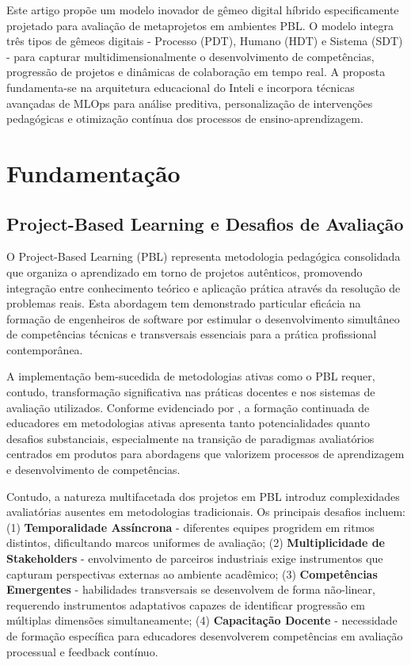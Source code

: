\documentclass[english, spanish, brazilian]{RBIEarticle} %
\begin{document}
Este artigo propõe um modelo inovador de gêmeo digital híbrido especificamente
projetado para avaliação de metaprojetos em ambientes PBL. O modelo integra
três tipos de gêmeos digitais - Processo (PDT), Humano (HDT) e Sistema (SDT) -
para capturar multidimensionalmente o desenvolvimento de competências,
progressão de projetos e dinâmicas de colaboração em tempo real. A proposta
fundamenta-se na arquitetura educacional do Inteli e incorpora técnicas
avançadas de MLOps para análise preditiva, personalização de intervenções
pedagógicas e otimização contínua dos processos de ensino-aprendizagem.

\section{Fundamentação}

\subsection{Project-Based Learning e Desafios de Avaliação}

O Project-Based Learning (PBL) representa metodologia pedagógica consolidada
que organiza o aprendizado em torno de projetos autênticos, promovendo
integração entre conhecimento teórico e aplicação prática através da resolução
de problemas reais. Esta abordagem tem demonstrado particular eficácia na
formação de engenheiros de software por estimular o desenvolvimento simultâneo
de competências técnicas e transversais essenciais para a prática profissional
contemporânea.

A implementação bem-sucedida de metodologias ativas como o PBL requer, contudo,
transformação significativa nas práticas docentes e nos sistemas de avaliação
utilizados. Conforme evidenciado por \cite{FormacaoEducadores2024}, a formação
continuada de educadores em metodologias ativas apresenta tanto potencialidades
quanto desafios substanciais, especialmente na transição de paradigmas
avaliatórios centrados em produtos para abordagens que valorizem processos de
aprendizagem e desenvolvimento de competências.

Contudo, a natureza multifacetada dos projetos em PBL introduz complexidades
avaliatórias ausentes em metodologias tradicionais. Os principais desafios
incluem: (1) \textbf{Temporalidade Assíncrona} - diferentes equipes progridem
em ritmos distintos, dificultando marcos uniformes de avaliação; (2)
\textbf{Multiplicidade de Stakeholders} - envolvimento de parceiros industriais
exige instrumentos que capturam perspectivas externas ao ambiente acadêmico;
(3) \textbf{Competências Emergentes} - habilidades transversais se desenvolvem
de forma não-linear, requerendo instrumentos adaptativos capazes de identificar
progressão em múltiplas dimensões simultaneamente; (4) \textbf{Capacitação
  Docente} - necessidade de formação específica para educadores desenvolverem
competências em avaliação processual e feedback contínuo.
\end{document}

